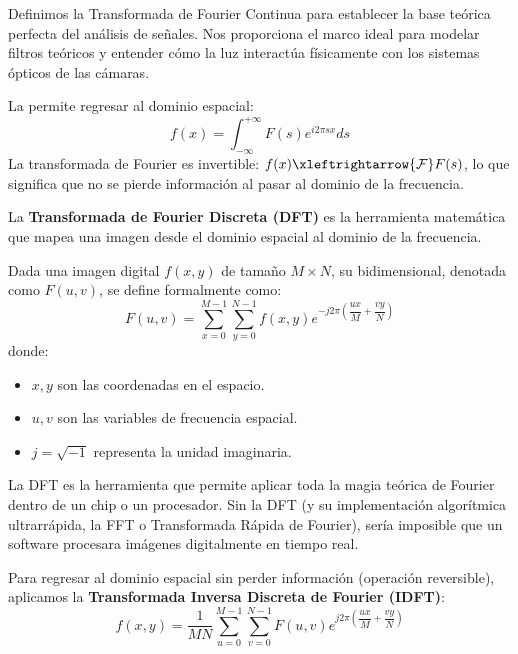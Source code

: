 \begin{observacion}
    Definimos la Transformada de Fourier Continua para establecer la base teórica perfecta del análisis de señales. Nos proporciona el marco ideal para modelar filtros teóricos y entender cómo la luz interactúa físicamente con los sistemas ópticos de las cámaras.
\end{observacion}

\begin{definicion}
    La  permite regresar al dominio espacial:
    $$f(x) = \int_{-\infty}^{+\infty} F(s) e^{i2\pi sx} ds$$
    La transformada de Fourier es invertible: $f(x) \xleftrightarrow{\mathcal{F}} F(s)$, lo que significa que no se pierde información al pasar al dominio de la frecuencia. \\
\end{definicion}


\noindent
La \textbf{Transformada de Fourier Discreta (DFT)} es la herramienta matemática que mapea una imagen desde el dominio espacial al dominio de la frecuencia.

\begin{definicion}
    Dada una imagen digital $f(x,y)$ de tamaño $M \times N$, su  bidimensional, denotada como $F(u,v)$, se define formalmente como:
    $$F(u,v) = \sum_{x=0}^{M-1} \sum_{y=0}^{N-1} f(x,y) e^{-j2\pi \left( \dfrac{ux}{M} + \dfrac{vy}{N} \right)}$$
    donde:
    \begin{itemize}
        \item $x, y$ son las coordenadas en el espacio.
        \item $u, v$ son las variables de frecuencia espacial.
        \item $j = \sqrt{-1}$ representa la unidad imaginaria.
    \end{itemize}
\end{definicion}

\begin{observacion}
    La DFT es la herramienta que permite aplicar toda la magia teórica de Fourier dentro de un chip o un procesador. Sin la DFT (y su implementación algorítmica ultrarrápida, la FFT o Transformada Rápida de Fourier), sería imposible que un software procesara imágenes digitalmente en tiempo real.
\end{observacion}

\begin{definicion}
    Para regresar al dominio espacial sin perder información (operación reversible), aplicamos la \textbf{Transformada Inversa Discreta de Fourier (IDFT)}:
    $$f(x,y) = \frac{1}{MN} \sum_{u=0}^{M-1} \sum_{v=0}^{N-1} F(u,v) e^{j2\pi \left( \dfrac{ux}{M} + \dfrac{vy}{N} \right)}$$
\end{definicion}

